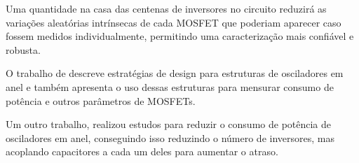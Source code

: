 Uma quantidade na casa das centenas de inversores no circuito reduzirá as variações aleatórias intrínsecas de cada MOSFET que poderiam aparecer caso fossem medidos individualmente, permitindo uma caracterização mais confiável e robusta.

O trabalho de \cite{Bhushan} descreve estratégias de design para estruturas de osciladores em anel e também apresenta o uso dessas estruturas para mensurar consumo de potência e outros parâmetros de MOSFETs.

Um outro trabalho, \cite{Michal} realizou estudos para reduzir o consumo de potência de osciladores em anel, conseguindo isso reduzindo o número de inversores, mas acoplando capacitores a cada um deles para aumentar o atraso.